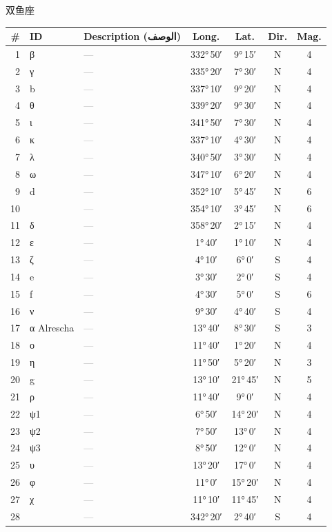 \documentclass[9pt,a4paper]{extarticle}
\newcommand{\ar}[1]{{\arabicfont\textarabic{#1}}}
\begin{document}
\vspace{4pt}\quad\ar{السمكتان}\quad 双鱼座
\begin{longtable}{r l >{\raggedright\arraybackslash}p{6.7cm} c c c c}
\toprule \# & ID & Description (\ar{الوصف}) & Long. & Lat. & Dir. & Mag.\\ \midrule\endhead
1 & β & \textcolor{gray}{—} & 332°\,50′ & 9°\,15′ & N & 4\\
2 & γ & \textcolor{gray}{—} & 335°\,20′ & 7°\,30′ & N & 4\\
3 & b & \textcolor{gray}{—} & 337°\,10′ & 9°\,20′ & N & 4\\
4 & θ & \textcolor{gray}{—} & 339°\,20′ & 9°\,30′ & N & 4\\
5 & ι & \textcolor{gray}{—} & 341°\,50′ & 7°\,30′ & N & 4\\
6 & κ & \textcolor{gray}{—} & 337°\,10′ & 4°\,30′ & N & 4\\
7 & λ & \textcolor{gray}{—} & 340°\,50′ & 3°\,30′ & N & 4\\
8 & ω & \textcolor{gray}{—} & 347°\,10′ & 6°\,20′ & N & 4\\
9 & d & \textcolor{gray}{—} & 352°\,10′ & 5°\,45′ & N & 6\\
10 &  & \textcolor{gray}{—} & 354°\,10′ & 3°\,45′ & N & 6\\
11 & δ & \textcolor{gray}{—} & 358°\,20′ & 2°\,15′ & N & 4\\
12 & ε & \textcolor{gray}{—} & 1°\,40′ & 1°\,10′ & N & 4\\
13 & ζ & \textcolor{gray}{—} & 4°\,10′ & 6°\,0′ & S & 4\\
14 & e & \textcolor{gray}{—} & 3°\,30′ & 2°\,0′ & S & 4\\
15 & f & \textcolor{gray}{—} & 4°\,30′ & 5°\,0′ & S & 6\\
16 & ν & \textcolor{gray}{—} & 9°\,30′ & 4°\,40′ & S & 4\\
17 & α Alrescha & \textcolor{gray}{—} & 13°\,40′ & 8°\,30′ & S & 3\\
18 & ο & \textcolor{gray}{—} & 11°\,40′ & 1°\,20′ & N & 4\\
19 & η & \textcolor{gray}{—} & 11°\,50′ & 5°\,20′ & N & 3\\
20 & g & \textcolor{gray}{—} & 13°\,10′ & 21°\,45′ & N & 5\\
21 & ρ & \textcolor{gray}{—} & 11°\,40′ & 9°\,0′ & N & 4\\
22 & ψ1 & \textcolor{gray}{—} & 6°\,50′ & 14°\,20′ & N & 4\\
23 & ψ2 & \textcolor{gray}{—} & 7°\,50′ & 13°\,0′ & N & 4\\
24 & ψ3 & \textcolor{gray}{—} & 8°\,50′ & 12°\,0′ & N & 4\\
25 & υ & \textcolor{gray}{—} & 13°\,20′ & 17°\,0′ & N & 4\\
26 & φ & \textcolor{gray}{—} & 11°\,0′ & 15°\,20′ & N & 4\\
27 & χ & \textcolor{gray}{—} & 11°\,10′ & 11°\,45′ & N & 4\\
28 &  & \textcolor{gray}{—} & 342°\,20′ & 2°\,40′ & S & 4\\
\bottomrule\end{longtable}
\end{document}
